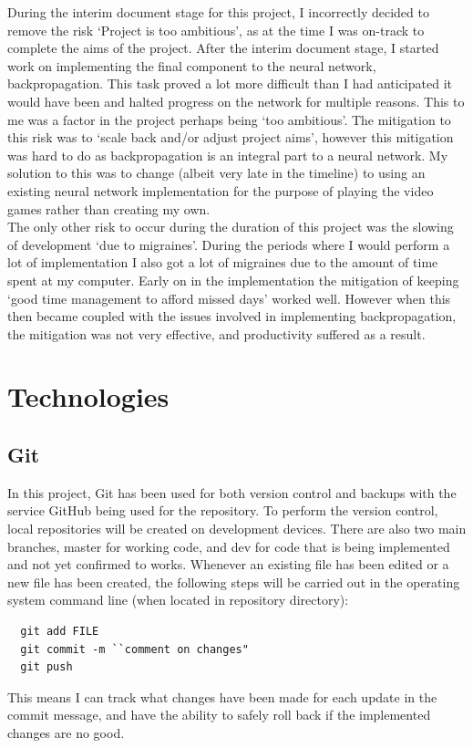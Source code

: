 \documentclass[10pt]{article}
\begin{document}
	During the interim document stage for this project, I incorrectly decided to remove the risk `Project is too ambitious', as at the time I was on-track to complete the aims of the project. After the interim document stage, I started work on implementing the final component to the neural network, backpropagation. This task proved a lot more difficult than I had anticipated it would have been and halted progress on the network for multiple reasons. This to me was a factor in the project perhaps being `too ambitious'. The mitigation to this risk was to `scale back and/or adjust project aims', however this mitigation was hard to do as backpropagation is an integral part to a neural network. My solution to this was to change (albeit very late in the timeline) to using an existing neural network implementation for the purpose of playing the video games rather than creating my own.\\
	
	The only other risk to occur during the duration of this project was the slowing of development `due to migraines'. During the periods where I would perform a lot of implementation I also got a lot of migraines due to the amount of time spent at my computer. Early on in the implementation the mitigation of keeping `good time management to afford missed days' worked well. However when this then became coupled with the issues involved in implementing backpropagation, the mitigation was not very effective, and productivity suffered as a result.
	
	\bigskip
\section{Technologies}
	
	\subsection{Git}
		In this project, Git has been used for both version control and backups with the service GitHub being used for the repository. To perform the version control, local repositories will be created on development devices. There are also two main branches, master for working code, and dev for code that is being implemented and not yet confirmed to works. Whenever an existing file has been edited or a new file has been created, the following steps will be carried out in the operating system command line (when located in repository directory):
		\begin{lstlisting}
  git add FILE
  git commit -m ``comment on changes"
  git push
		\end{lstlisting}
		This means I can track what changes have been made for each update in the commit message, and have the ability to safely roll back if the implemented changes are no good.
		
\end{document}

